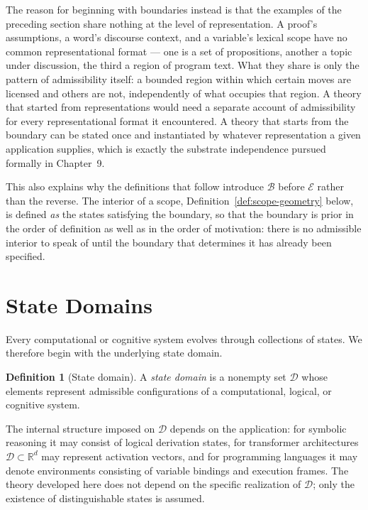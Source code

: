 \documentclass[11pt,twoside,openright]{book}
\numberwithin{equation}{chapter}
\theoremstyle{definition}
\newtheorem{definition}{Definition}[chapter]
\theoremstyle{plain}
\theoremstyle{remark}
\theoremstyle{definition}
\newcommand{\Boundary}{\mathcal{B}}
\newcommand{\Interior}{\mathcal{E}}
\newcommand{\Domain}{\mathcal{D}}
\begin{document}
The reason for beginning with boundaries instead is that the examples of
the preceding section share nothing at the level of representation. A
proof's assumptions, a word's discourse context, and a variable's
lexical scope have no common representational format --- one is a set of
propositions, another a topic under discussion, the third a region of
program text. What they share is only the pattern of admissibility
itself: a bounded region within which certain moves are licensed and
others are not, independently of what occupies that region. A theory
that started from representations would need a separate account of
admissibility for every representational format it encountered. A theory
that starts from the boundary can be stated once and instantiated by
whatever representation a given application supplies, which is exactly
the substrate independence pursued formally in Chapter~9.

This also explains why the definitions that follow introduce
$\Boundary$ before $\Interior$ rather than the reverse. The interior of a
scope, Definition~\ref{def:scope-geometry} below, is defined \emph{as}
the states satisfying the boundary, so that the boundary is prior in the
order of definition as well as in the order of motivation: there is no
admissible interior to speak of until the boundary that determines it has
already been specified.

\section{State Domains}

Every computational or cognitive system evolves through collections of
states. We therefore begin with the underlying state domain.

\begin{definition}[State domain]
A \emph{state domain} is a nonempty set $\Domain$ whose elements represent
admissible configurations of a computational, logical, or cognitive
system.
\end{definition}

The internal structure imposed on $\Domain$ depends on the application: for
symbolic reasoning it may consist of logical derivation states, for
transformer architectures $\Domain\subset\mathbb{R}^d$ may represent
activation vectors, and for programming languages it may denote
environments consisting of variable bindings and execution frames. The
theory developed here does not depend on the specific realization of
$\Domain$; only the existence of distinguishable states is assumed.
\end{document}
